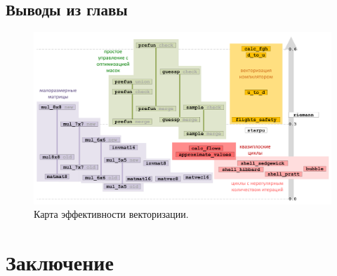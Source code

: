 \documentclass[a4paper,14pt]{extarticle}                     %
\numberwithin{equation}{section}                             %
\numberwithin{figure}{section}                               %
\numberwithin{table}{section}                                %
\theoremstyle{plain}                                         %
\numberwithin{theorem}{section}                              %
\numberwithin{lemma}{section}                                %
\numberwithin{definition}{section}                           %
\begin{document}










%






\subsection{Выводы из главы}

\begin{figure}[ht]
\centering
\includegraphics[width=1.0\textwidth]{./pics/text_4_fin/map_cut.pdf}
\singlespacing
{}\caption{Карта эффективности векторизации.}
\label{fig:text_4_fin_map}
\end{figure}


\newpage
\section*{Заключение}                                        %




\end{document}
